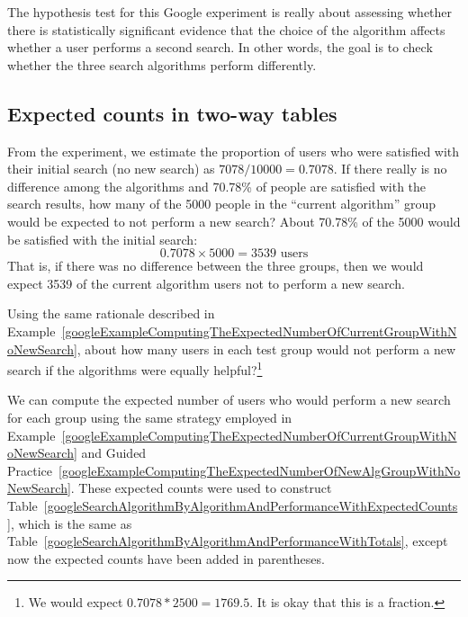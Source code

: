 The hypothesis test for this Google experiment is really about assessing whether there is statistically significant evidence that the choice of the algorithm affects whether a user performs a second search. In other words, the goal is to check whether the three search algorithms perform differently.


\subsection{Expected counts in two-way tables}

\begin{example}{From the experiment, we estimate the proportion of users who were satisfied with their initial search (no new search) as $7078/10000 = 0.7078$. If there really is no difference among the algorithms and 70.78\% of people are satisfied with the search results, how many of the 5000 people in the ``current algorithm'' group would be expected to not perform a new search?} \label{googleExampleComputingTheExpectedNumberOfCurrentGroupWithNoNewSearch}
About 70.78\% of the 5000 would be satisfied with the initial search:
$$ 0.7078\times 5000 = 3539\text{ users} $$
That is, if there was no difference between the three groups, then we would expect 3539 of the current algorithm users not to perform a new search.
\end{example}

\begin{exercise}\label{googleExampleComputingTheExpectedNumberOfNewAlgGroupWithNoNewSearch}
Using the same rationale described in Example~\ref{googleExampleComputingTheExpectedNumberOfCurrentGroupWithNoNewSearch}, about how many users in each test group would not perform a new search if the algorithms were equally helpful?\footnote{We would expect $0.7078*2500 = 1769.5$. It is okay that this is a fraction.}
\end{exercise}

We can compute the expected number of users who would perform a new search for each group using the same strategy employed in Example~\ref{googleExampleComputingTheExpectedNumberOfCurrentGroupWithNoNewSearch} and Guided Practice~\ref{googleExampleComputingTheExpectedNumberOfNewAlgGroupWithNoNewSearch}. These expected counts were used to construct Table~\ref{googleSearchAlgorithmByAlgorithmAndPerformanceWithExpectedCounts}, which is the same as Table~\ref{googleSearchAlgorithmByAlgorithmAndPerformanceWithTotals}, except now the expected counts have been added in parentheses.

